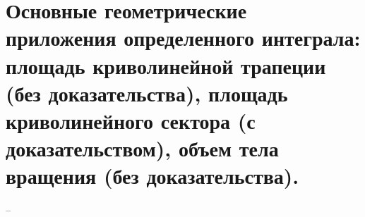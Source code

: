 \section{Основные геометрические приложения определенного интеграла: площадь криволинейной трапеции (без доказательства), площадь криволинейного сектора (с доказательством), объем тела вращения (без доказательства).}
--
\newline